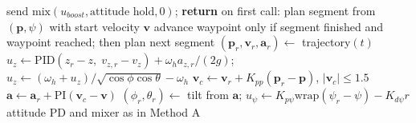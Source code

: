 \begin{algorithm}[h]
\caption{Method B step (improved)}
\label{alg:b}
\begin{algorithmic}[1]
\State send $\mathrm{mix}(u_{boost}, \text{attitude hold}, 0)$; \textbf{return}
\EndIf
\State on first call: plan segment from $(\mathbf p, \psi)$ with start velocity $\mathbf v$
\State advance waypoint only if segment finished and waypoint reached; then plan next segment
\State $(\mathbf p_r, \mathbf v_r, \mathbf a_r) \gets$ trajectory$(t)$
\State $u_z \gets \mathrm{PID}(z_r - z,\; v_{z,r} - v_z) + \omega_h a_{z,r}/(2g)$; \; $u_z \gets (\omega_h + u_z)/\sqrt{\cos\phi\cos\theta} - \omega_h$
\State $\mathbf v_c \gets \mathbf v_r + K_{pp}(\mathbf p_r - \mathbf p)$, $|\mathbf v_c| \le 1.5$
\State $\mathbf a \gets \mathbf a_r + \mathrm{PI}(\mathbf v_c - \mathbf v)$ 
\State $(\phi_r, \theta_r) \gets$ tilt from $\mathbf a$; $u_\psi \gets K_{p\psi}\mathrm{wrap}(\psi_r - \psi) - K_{d\psi} r$
\State attitude PD and mixer as in Method A
\end{algorithmic}
\end{algorithm}

